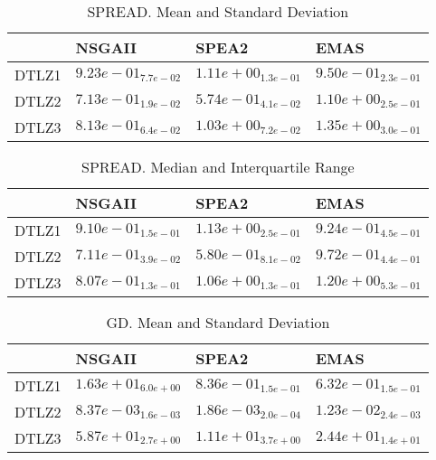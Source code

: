 \documentclass{article}
\begin{document}
\begin{table}
\caption{SPREAD. Mean and Standard Deviation}
\label{table: SPREAD}
\centering
\begin{scriptsize}
\begin{tabular}{llll}
\hline & NSGAII & SPEA2 &  EMAS\\
\hline 
DTLZ1 & \cellcolor{gray95}$  9.23e-01_{ 7.7e-02}$ & $  1.11e+00_{ 1.3e-01}$ & \cellcolor{gray25}$  9.50e-01_{ 2.3e-01}$ \\
DTLZ2 & \cellcolor{gray25}$  7.13e-01_{ 1.9e-02}$ & \cellcolor{gray95}$  5.74e-01_{ 4.1e-02}$ & $  1.10e+00_{ 2.5e-01}$ \\
DTLZ3 & \cellcolor{gray95}$  8.13e-01_{ 6.4e-02}$ & \cellcolor{gray25}$  1.03e+00_{ 7.2e-02}$ & $  1.35e+00_{ 3.0e-01}$ \\
\hline
\end{tabular}
\end{scriptsize}
\end{table}

\begin{table}
\caption{SPREAD. Median and Interquartile Range}
\label{table: SPREAD}
\centering
\begin{scriptsize}
\begin{tabular}{llll}
\hline & NSGAII & SPEA2 &  EMAS\\
\hline 
DTLZ1 & \cellcolor{gray95}$  9.10e-01_{ 1.5e-01}$ & $  1.13e+00_{ 2.5e-01}$ & \cellcolor{gray25}$  9.24e-01_{ 4.5e-01}$ \\
DTLZ2 & \cellcolor{gray25}$  7.11e-01_{ 3.9e-02}$ & \cellcolor{gray95}$  5.80e-01_{ 8.1e-02}$ & $  9.72e-01_{ 4.4e-01}$ \\
DTLZ3 & \cellcolor{gray95}$  8.07e-01_{ 1.3e-01}$ & \cellcolor{gray25}$  1.06e+00_{ 1.3e-01}$ & $  1.20e+00_{ 5.3e-01}$ \\
\hline
\end{tabular}
\end{scriptsize}
\end{table}

\begin{table}
\caption{GD. Mean and Standard Deviation}
\label{table: GD}
\centering
\begin{scriptsize}
\begin{tabular}{llll}
\hline & NSGAII & SPEA2 &  EMAS\\
\hline 
DTLZ1 & $  1.63e+01_{ 6.0e+00}$ & \cellcolor{gray25}$  8.36e-01_{ 1.5e-01}$ & \cellcolor{gray95}$  6.32e-01_{ 1.5e-01}$ \\
DTLZ2 & \cellcolor{gray25}$  8.37e-03_{ 1.6e-03}$ & \cellcolor{gray95}$  1.86e-03_{ 2.0e-04}$ & $  1.23e-02_{ 2.4e-03}$ \\
DTLZ3 & $  5.87e+01_{ 2.7e+00}$ & \cellcolor{gray95}$  1.11e+01_{ 3.7e+00}$ & \cellcolor{gray25}$  2.44e+01_{ 1.4e+01}$ \\
\hline
\end{tabular}
\end{scriptsize}
\end{table}
\end{document}

